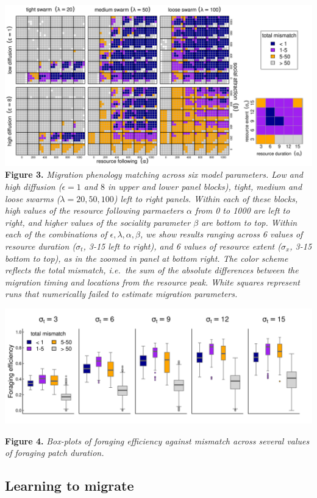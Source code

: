 \documentclass[12pt]{article}
\begin{document}
\includegraphics{figures/StabilityResults.png} \textbf{Figure 3.}
\emph{Migration phenology matching across six model parameters. Low and
high diffusion (\(\epsilon = 1\) and \(8\) in upper and lower panel
blocks), tight, medium and loose swarms (\(\lambda = 20, 50, 100\)) left
to right panels. Within each of these blocks, high values of the
resource following parmaeters \(\alpha\) from 0 to 1000 are left to
right, and higher values of the sociality parameter \(\beta\) are bottom
to top. Within each of the combinations of
\(\epsilon, \lambda, \alpha, \beta\), we show results ranging across 6
values of resource duration (\(\sigma_t\), 3-15 left to right), and 6
values of resource extent (\(\sigma_x\), 3-15 bottom to top), as in the
zoomed in panel at bottom right. The color scheme reflects the total
mismatch, i.e.~the sum of the absolute differences between the migration
timing and locations from the resource peak. White squares represent
runs that numerically failed to estimate migration parameters.}

\includegraphics{figures/ForagingEfficiency.png}

\textbf{Figure 4.} \emph{Box-plots of foraging efficiency against
mismatch across several values of foraging patch duration.}

\hypertarget{learning-to-migrate}{%
\subsection{Learning to migrate}\label{learning-to-migrate}}
\end{document}
